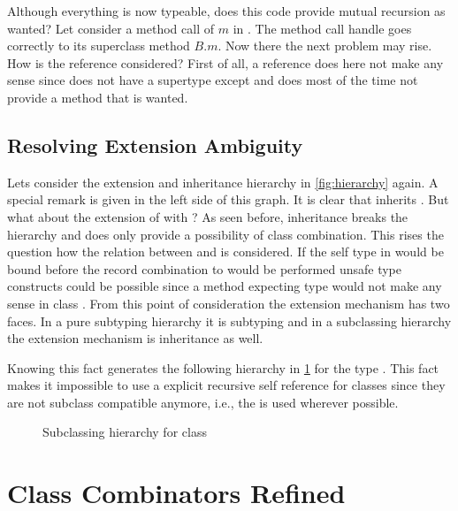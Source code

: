 Although everything is now typeable, does this code provide mutual
recursion as wanted?  Let consider a method call of $m$ in \C. The
method call handle goes correctly to its superclass method $B.m$. Now
there the next problem may rise. How is the \base reference considered?
First of all, a \base reference does here not make any sense since
\C does not have a supertype except \object and \object does most 
of the time not provide a method that is wanted.

\subsection{Resolving Extension Ambiguity}
\label{sec:resolveAmbiguity}
Lets consider the extension and inheritance hierarchy in \cref{fig:hierarchy}
again. A special remark is given in the left side of this graph. It is clear
that \E inherits \B. But what about the extension of \A 
with \B? As seen before, inheritance breaks the hierarchy and does only
provide a possibility of class combination. This rises the question how the 
relation between \A and \B is considered. If the self type in 
\A would be bound before the record combination to \E would be
performed unsafe type constructs could be possible since a method expecting 
type \A would not make any sense in class \E. From this point of 
consideration the extension mechanism has two faces. In a pure subtyping 
hierarchy it is subtyping and in a subclassing hierarchy the extension
mechanism is inheritance as well.

Knowing this fact generates the following hierarchy in \cref{fig:fixedHierarchy}
for the type \E. This fact makes it impossible to use a explicit recursive
self reference for classes since they are not subclass compatible anymore, i.e.,
the \mytype is used wherever possible.

\begin{figure}[ht]
	\centering
	\caption{Subclassing hierarchy for class \E}
	\label{fig:fixedHierarchy}
\end{figure}
%

\section{Class Combinators Refined}


